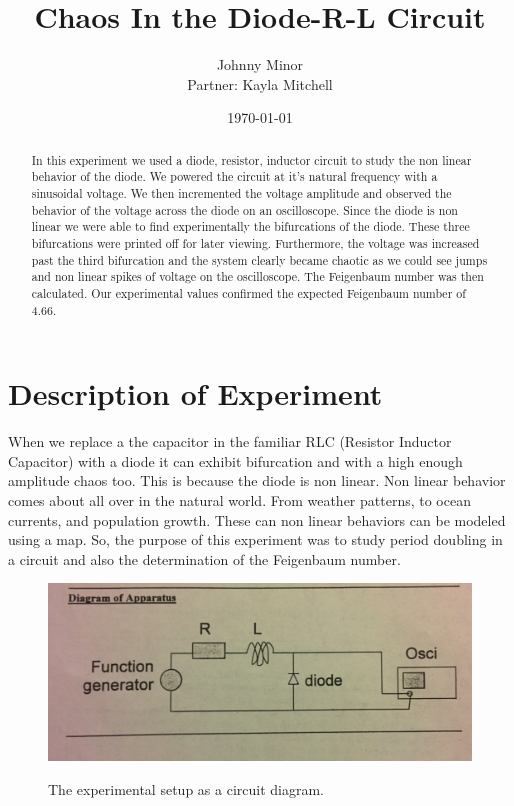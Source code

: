 \documentclass[12pt letterpaper]{article}
\title{Chaos In the Diode-R-L Circuit}
\author{Johnny Minor \\ Partner: Kayla Mitchell}
\date{\today}
\begin{document}
\maketitle

\begin{abstract}
In this experiment we used a diode, resistor, inductor circuit to study the non linear behavior of the diode. We powered the circuit at it's natural frequency with a sinusoidal voltage. We then incremented the voltage amplitude and observed the behavior of the voltage across the diode on an oscilloscope. Since the diode is non linear we were able to find experimentally the bifurcations of the diode. These three bifurcations were printed off for later viewing. Furthermore, the voltage was increased past the third bifurcation and the system clearly became chaotic as we could see jumps and non linear spikes of voltage on the oscilloscope. The Feigenbaum number was then calculated. Our experimental values confirmed the expected Feigenbaum number of 4.66. 
\end{abstract}

\newpage

\section*{Description of Experiment}

When we replace a the capacitor in the familiar RLC (Resistor Inductor Capacitor) with a diode it can exhibit bifurcation and with a high enough amplitude chaos too. This is because the diode is non linear. Non linear behavior comes about all over in the natural world. From weather patterns, to ocean currents, and population growth. These can non linear behaviors can be modeled using a map.  So, the purpose of this experiment was to study period doubling in a circuit and also the determination of the Feigenbaum number. 

\begin{figure}[H]
  \caption{The experimental setup as a circuit diagram.}
  \centering
    \includegraphics[width=.60\textwidth]{circuit_chaos.jpg}
    \label{fig:circuit}
\end{figure}
\end{document}
